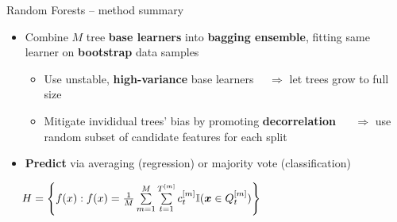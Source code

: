 \begin{frame}{Random Forests -- method summary}

 
  

\medskip

\begin{itemize}
  \item Combine $M$ tree \textbf{base learners} into 
  \textbf{bagging ensemble}, fitting same learner on \textbf{bootstrap} data
  samples
   \begin{itemize}
    \item Use unstable, \textbf{high-variance} base learners ~~$\Rightarrow$
    let trees grow to full size
    \item Mitigate invididual trees' bias by promoting \textbf{decorrelation} 
    ~~ $\Rightarrow$ use random subset of 
    candidate features for each split
  \end{itemize}
  \item \textbf{Predict} via averaging (regression) or majority vote 
  (classification)
\end{itemize}

\medskip

 ~~
$H = \left\{ f(x): f(x) = \frac{1}{M} \sum\limits_{m = 1}^M 
\sum\limits_{t = 1}^{T^{[m]}} 
c_t^{[m]} \mathbb{I}(\bm{x} \in Q_t^{[m]}) \right\}$

\medskip


\end{frame}

